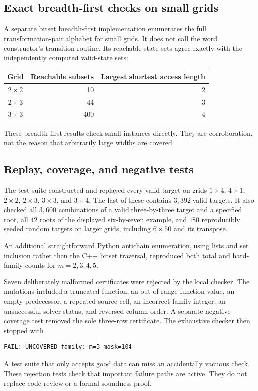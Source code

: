 \documentclass[11pt,letterpaper]{article}
\numberwithin{equation}{section}
\theoremstyle{definition}
\theoremstyle{remark}
\begin{document}
\subsection{Exact breadth-first checks on small grids}
A separate bitset breadth-first implementation enumerates the full
transformation-pair alphabet for small grids. It does not call the word
constructor's transition routine. Its reachable-state sets agree exactly
with the independently computed valid-state sets:
\begin{center}
\begin{tabular}{crr}
\toprule
Grid & Reachable subsets & Largest shortest access length \\
\midrule
$2\times2$ & 10 & 2\\
$2\times3$ & 44 & 3\\
$3\times3$ & 400 & 4\\
\bottomrule
\end{tabular}
\end{center}
These breadth-first results check small instances directly. They are
corroboration, not the reason that arbitrarily large widths are covered.

\subsection{Replay, coverage, and negative tests}
The test suite constructed and replayed every valid target on grids
$1\times4$, $4\times1$, $2\times2$, $2\times3$, $3\times3$, and
$3\times4$. The last of these contains $3,392$ valid targets. It also
checked all $3,600$ combinations of a valid three-by-three target and a
specified root, all $42$ roots of the displayed six-by-seven example,
and $180$ reproducibly seeded random targets on larger grids, including
$6\times50$ and its transpose.

An additional straightforward Python antichain enumeration, using lists
and set inclusion rather than the C++ bitset traversal, reproduced both
total and hard-family counts for $m=2,3,4,5$.

Seven deliberately malformed certificates were rejected by the local
checker. The mutations included a truncated function, an out-of-range
function value, an empty predecessor, a repeated source cell, an incorrect
family integer, an unsuccessful solver status, and reversed column order.
A separate negative coverage test removed the sole three-row certificate.
The exhaustive checker then stopped with
\begin{lstlisting}
FAIL: UNCOVERED family: m=3 mask=104
\end{lstlisting}
A test suite that only accepts good data can miss an accidentally vacuous
check. These rejection tests check that important failure paths are active.
They do not replace code review or a formal soundness proof.
\end{document}
